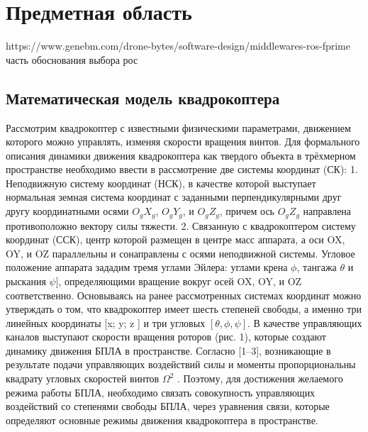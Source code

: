 
\section{Предметная область}

https://www.genebm.com/drone-bytes/software-design/middlewares-ros-fprime часть обоснования выбора рос

\subsection{Математическая модель квадрокоптера}
Рассмотрим квадрокоптер с известными физическими параметрами, движением которого можно управлять, изменяя скорости вращения винтов. Для формального описания динамики движения квадрокоптера как твердого объекта в трёхмерном пространстве необходимо ввести в рассмотрение две системы координат (СК):
1. Неподвижную систему координат (НСК), в качестве которой выступает нормальная земная система координат с заданными перпендикулярными друг другу координатными осями \(O_{g}X_{g}\), \(O_{g}Y_{g}\), и \(O_{g}Z_{g}\), причем ось \(O_{g}Z_{g}\) направлена противоположно вектору силы тяжести.
2. Связанную с квадрокоптером систему координат (ССК), центр которой размещен в центре масс аппарата, а оси OX, OY, и OZ параллельны и сонаправлены с осями неподвижной системы. Угловое положение аппарата зададим тремя углами Эйлера: углами крена \(\phi\), тангажа \(\theta\) и рыскания \(\psi]\), определяющими вращение вокруг осей OX, OY, и OZ соответственно. Основываясь на ранее рассмотренных системах координат можно утверждать о том, что квадрокоптер имеет шесть степеней свободы, а именно три линейных координаты [x; y; z ] и три угловых \([\theta, \phi, \psi]\). В качестве управляющих каналов выступают скорости вращения роторов (рис. 1), которые создают динамику движения БПЛА в пространстве. Согласно [1–3], возникающие в результате подачи управляющих воздействий силы и моменты пропорциональны квадрату угловых скоростей винтов \(\Omega^2\) . Поэтому, для достижения желаемого режима работы БПЛА, необходимо связать совокупность управляющих воздействий со степенями свободы БПЛА, через уравнения связи, которые определяют основные режимы движения квадрокоптера в пространстве.

